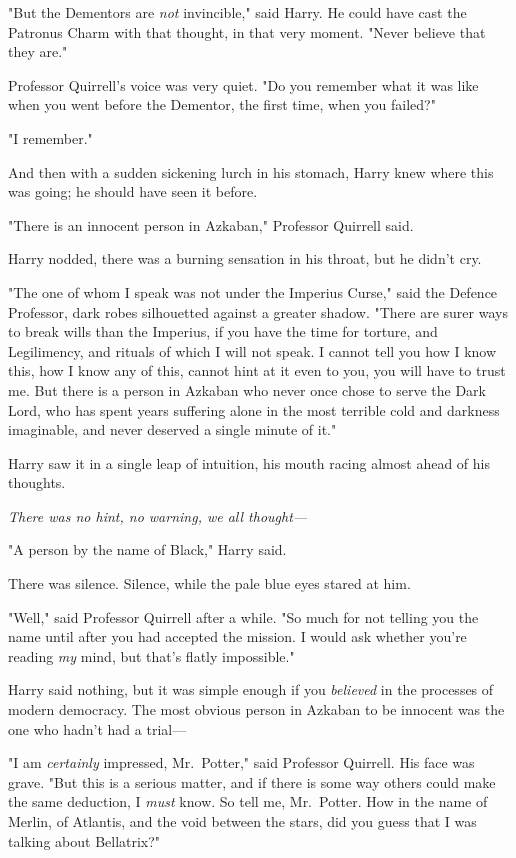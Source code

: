 "But the Dementors are \emph{not} invincible," said Harry. He could have cast
the Patronus Charm with that thought, in that very moment. "Never believe that
they are."

Professor Quirrell's voice was very quiet. "Do you remember what it was like
when you went before the Dementor, the first time, when you failed?"

"I remember."

And then with a sudden sickening lurch in his stomach, Harry knew where this
was going; he should have seen it before.

"There is an innocent person in Azkaban," Professor Quirrell said.

Harry nodded, there was a burning sensation in his throat, but he didn't cry.

"The one of whom I speak was not under the Imperius Curse," said the Defence
Professor, dark robes silhouetted against a greater shadow. "There are surer
ways to break wills than the Imperius, if you have the time for torture, and
Legilimency, and rituals of which I will not speak. I cannot tell you how I
know this, how I know any of this, cannot hint at it even to you, you will have
to trust me. But there is a person in Azkaban who never once chose to serve the
Dark Lord, who has spent years suffering alone in the most terrible cold and
darkness imaginable, and never deserved a single minute of it."

Harry saw it in a single leap of intuition, his mouth racing almost ahead of
his thoughts.

\emph{There was no hint, no warning, we all thought---}

"A person by the name of Black," Harry said.

There was silence. Silence, while the pale blue eyes stared at him.

"Well," said Professor Quirrell after a while. "So much for not telling you the
name until after you had accepted the mission. I would ask whether you're
reading \emph{my} mind, but that's flatly impossible."

Harry said nothing, but it was simple enough if you \emph{believed} in the
processes of modern democracy. The most obvious person in Azkaban to be
innocent was the one who hadn't had a trial---

"I am \emph{certainly} impressed, Mr.~Potter," said Professor Quirrell. His
face was grave. "But this is a serious matter, and if there is some way others
could make the same deduction, I \emph{must} know. So tell me, Mr.~Potter. How
in the name of Merlin, of Atlantis, and the void between the stars, did you
guess that I was talking about Bellatrix?"
